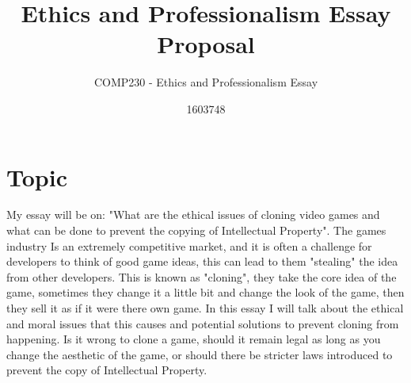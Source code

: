 \documentclass{scrartcl}
\title{Ethics and Professionalism Essay Proposal}
\subtitle{COMP230 - Ethics and Professionalism Essay}
\author{1603748}
\begin{document}
\maketitle

\section*{Topic}

My essay will be on: "What are the ethical issues of cloning video games and what can be done to prevent the copying of Intellectual Property". The games industry Is an extremely competitive market, and it is often a challenge for developers to think of good game ideas, this can lead to them "stealing" the idea from other developers. This is known as "cloning", they take the core idea of the game, sometimes they change it a little bit and change the look of the game, then they sell it as if it were there own game. In this essay I will talk about the ethical and moral issues that this causes and potential solutions to prevent cloning from happening. Is it wrong to clone a game, should it remain legal as long as you change the aesthetic of the game, or should there be stricter laws introduced to prevent the copy of Intellectual Property. 

\end{document}
